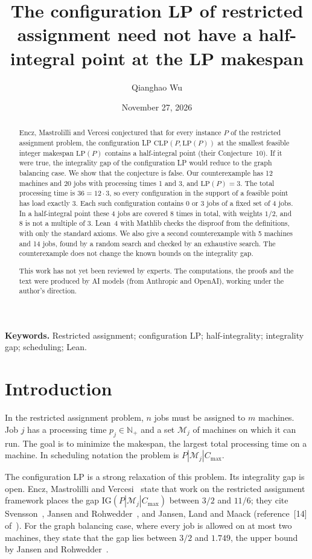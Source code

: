\documentclass[11pt]{article}
\title{The configuration LP of restricted assignment need not have a half-integral point at the LP makespan}
\author{Qianghao Wu}
\date{November 27, 2026}
\theoremstyle{remark}
\newcommand{\cM}{\mathcal{M}}
\newcommand{\CLP}{\mathrm{CLP}}
\newcommand{\LP}{\mathrm{LP}}
\begin{document}
\maketitle
\begin{abstract}
Encz, Mastrolilli and Vercesi conjectured that for every instance $P$ of
the restricted assignment problem, the configuration LP
$\CLP(P,\LP(P))$ at the smallest feasible integer makespan $\LP(P)$
contains a half-integral point (their Conjecture~10). If it were true,
the integrality gap of the configuration LP would reduce to the graph
balancing case. We show that the conjecture is false. Our
counterexample has 12 machines and 20 jobs with processing times 1 and
3, and $\LP(P)=3$. The total processing time is $36=12\cdot 3$, so every
configuration in the support of a feasible point has load exactly 3.
Each such configuration contains 0 or 3 jobs of a fixed set of 4 jobs.
In a half-integral point these 4 jobs are covered 8 times in total, with
weights $1/2$, and 8 is not a multiple of 3. Lean~4 with Mathlib checks
the disproof from the definitions, with only the standard axioms. We
also give a second counterexample with 5 machines and 14 jobs, found by
a random search and checked by an exhaustive search. The
counterexample does not change the known bounds on the integrality gap.

This work has not yet been reviewed by experts. The computations, the
proofs and the text were produced by AI models (from Anthropic and
OpenAI), working under the author's direction.
\end{abstract}
\medskip
\noindent\textbf{Keywords.} Restricted assignment; configuration LP;
half-integrality; integrality gap; scheduling; Lean.

\section{Introduction}
In the restricted assignment problem, $n$ jobs must be assigned to $m$
machines. Job $j$ has a processing time $p_j\in\mathbb{N}_+$ and a set
$\cM_j$ of machines on which it can run. The goal is to minimize the
makespan, the largest total processing time on a machine. In scheduling
notation the problem is $P|\cM_j|C_{\max}$.

The configuration LP is a strong relaxation of this problem. Its
integrality gap is open. Encz, Mastrolilli and Vercesi~\cite{EMV} state
that work on the restricted assignment framework places the gap
$\mathrm{IG}(P|\cM_j|C_{\max})$ between $3/2$ and $11/6$; they cite
Svensson~\cite{Sv}, Jansen and Rohwedder~\cite{JR17}, and Jansen, Land
and Maack (reference~[14] of~\cite{EMV}). For the graph balancing case,
where every job is allowed on at most two machines, they state that the
gap lies between $3/2$ and $1.749$, the upper bound by Jansen and
Rohwedder~\cite{JR18}.
\end{document}
